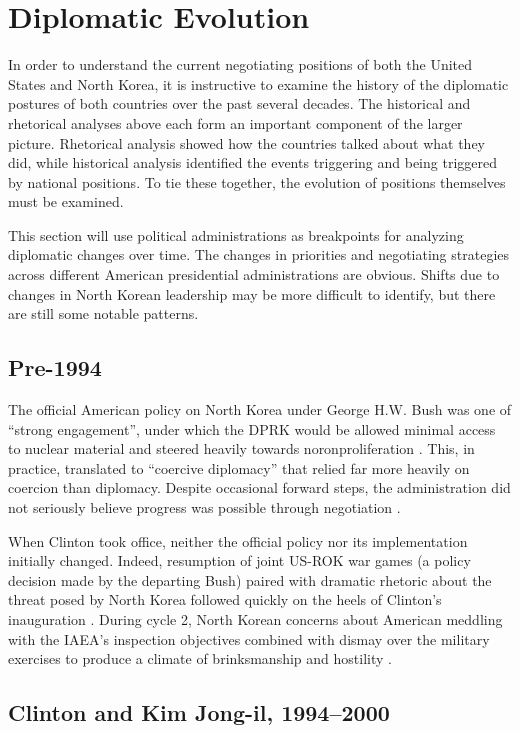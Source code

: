 \chapter{Diplomatic Evolution}

In order to understand the current negotiating positions of both the United States and North Korea, it is instructive to examine the history of the diplomatic postures of both countries over the past several decades. The historical and rhetorical analyses above each form an important component of the larger picture. Rhetorical analysis showed how the countries talked about what they did, while historical analysis identified the events triggering and being triggered by national positions. To tie these together, the evolution of positions themselves must be examined.

This section will use political administrations as breakpoints for analyzing diplomatic changes over time. The changes in priorities and negotiating strategies across different American presidential administrations are obvious. Shifts due to changes in North Korean leadership may be more difficult to identify, but there are still some notable patterns.

\section{Pre-1994}

The official American policy on North Korea under George H.W. Bush was one of ``strong engagement'', under which the DPRK would be allowed minimal access to nuclear material and steered heavily towards noronproliferation \cite{cerami}. This, in practice, translated to ``coercive diplomacy'' that relied far more heavily on coercion than diplomacy. Despite occasional forward steps, the administration did not seriously believe progress was possible through negotiation \cite{sigal}.

When Clinton took office, neither the official policy nor its implementation initially changed. Indeed, resumption of joint US-ROK war games (a policy decision made by the departing Bush) paired with dramatic rhetoric about the threat posed by North Korea followed quickly on the heels of Clinton's inauguration \cite{cumings}. During cycle 2, North Korean concerns about American meddling with the IAEA's inspection objectives combined with dismay over the military exercises to produce a climate of brinksmanship and hostility \cite{cumings}.

\section{Clinton and Kim Jong-il, 1994--2000}


